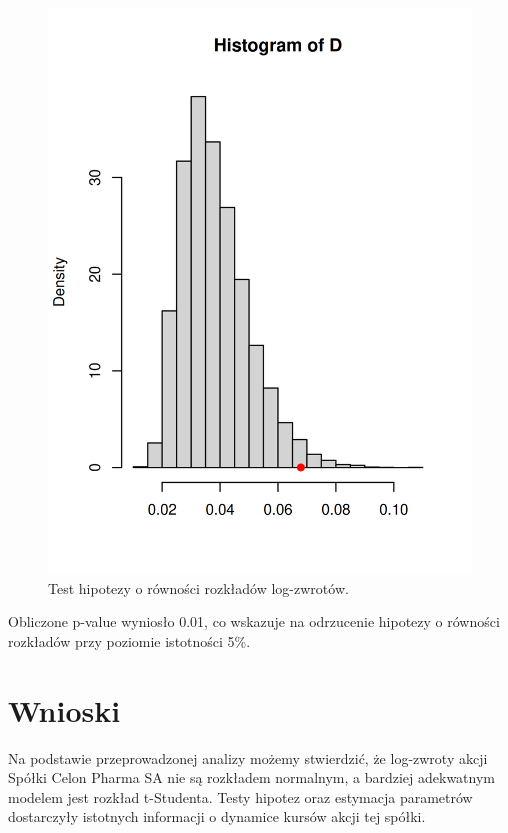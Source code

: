 \documentclass[a4paper,12pt]{article}
\begin{document}
\begin{figure}[h!]
\centering
\includegraphics[width=\textwidth]{img/hipoteza_o_rownosci_cln.png}
\caption{Test hipotezy o równości rozkładów log-zwrotów.}
\end{figure}

Obliczone p-value wyniosło 0.01, co wskazuje na odrzucenie hipotezy o równości rozkładów przy poziomie istotności 5\%.

\section{Wnioski}
Na podstawie przeprowadzonej analizy możemy stwierdzić, że log-zwroty akcji Spółki Celon Pharma SA nie są rozkładem normalnym, a bardziej adekwatnym modelem jest rozkład t-Studenta. Testy hipotez oraz estymacja parametrów dostarczyły istotnych informacji o dynamice kursów akcji tej spółki.
\end{document}
